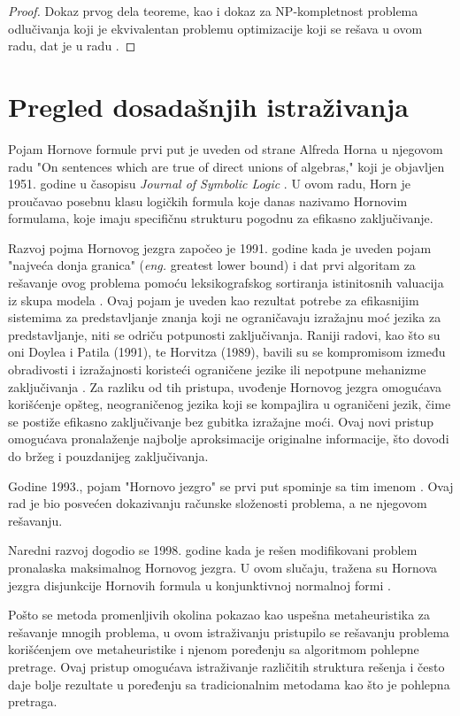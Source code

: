 \documentclass[12pt,oneside]{memoir}
\begin{document}
\begin{proof}
    Dokaz prvog dela teoreme, kao i dokaz za NP-kompletnost problema odlučivanja koji je ekvivalentan problemu optimizacije koji se rešava u ovom radu, dat je u radu \cite{doc3}.
\end{proof}

\section{Pregled dosadašnjih istraživanja}

Pojam Hornove formule prvi put je uveden od strane Alfreda Horna u njegovom radu "On sentences which are true of direct unions of algebras," koji je objavljen 1951. godine u časopisu \textit{Journal of Symbolic Logic} \cite{doc_horn_clause}. U ovom radu, Horn je proučavao posebnu klasu logičkih formula koje danas nazivamo Hornovim formulama, koje imaju specifičnu strukturu pogodnu za efikasno zaključivanje.

Razvoj pojma Hornovog jezgra započeo je 1991. godine kada je uveden pojam "najveća donja granica" (\textit{eng.} greatest lower bound) i dat prvi algoritam za rešavanje ovog problema pomoću leksikografskog sortiranja istinitosnih valuacija iz skupa modela \cite{doc2}. Ovaj pojam je uveden kao rezultat potrebe za efikasnijim sistemima za predstavljanje znanja koji ne ograničavaju izražajnu moć jezika za predstavljanje, niti se odriču potpunosti zaključivanja. Raniji radovi, kao što su oni Doylea i Patila (1991), te Horvitza (1989), bavili su se kompromisom između obradivosti i izražajnosti koristeći ograničene jezike ili nepotpune mehanizme zaključivanja \cite{doyle1991, horvitz1989}. Za razliku od tih pristupa, uvođenje Hornovog jezgra omogućava korišćenje opšteg, neograničenog jezika koji se kompajlira u ograničeni jezik, čime se postiže efikasno zaključivanje bez gubitka izražajne moći. Ovaj novi pristup omogućava pronalaženje najbolje aproksimacije originalne informacije, što dovodi do bržeg i pouzdanijeg zaključivanja.

Godine 1993., pojam "Hornovo jezgro" se prvi put spominje sa tim imenom \cite{doc3}. Ovaj rad je bio posvećen dokazivanju računske složenosti problema, a ne njegovom rešavanju.

Naredni razvoj dogodio se 1998. godine kada je rešen modifikovani problem pronalaska maksimalnog Hornovog jezgra. U ovom slučaju, tražena su Hornova jezgra disjunkcije Hornovih formula u konjunktivnoj normalnoj formi \cite{doc1}.

Pošto se metoda promenljivih okolina pokazao kao uspešna metaheuristika za rešavanje mnogih problema, u ovom istraživanju pristupilo se rešavanju problema korišćenjem ove metaheuristike i njenom poređenju sa algoritmom pohlepne pretrage. Ovaj pristup omogućava istraživanje različitih struktura rešenja i često daje bolje rezultate u poređenju sa tradicionalnim metodama kao što je pohlepna pretraga.
\end{document}
